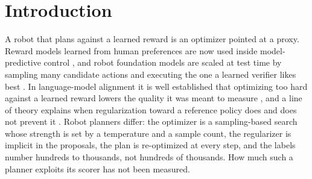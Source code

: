 \documentclass{article}
\theoremstyle{plain}
\theoremstyle{remark}
\begin{document}
\section{Introduction}
\label{sec:intro}

A robot that plans against a learned reward is an optimizer pointed at a proxy. Reward models learned from human
preferences are now used inside model-predictive control \citep{krupa2025learning,elhasnaouy2026active,nabail2026ubp2},
and robot foundation models are scaled at test time by sampling many candidate actions and executing the one a learned
verifier likes best \citep{kwok2025robomonkey}. In language-model alignment it is well established that optimizing
too hard against a learned reward lowers the quality it was meant to measure \citep{gao2023scaling,
coste2024ensembles,eisenstein2024helping}, and a line of theory explains when regularization toward a reference
policy does and does not prevent it \citep{huang2025chipo,huang2025bestofn,kwa2024catastrophic,laidlaw2025correlated}.
Robot planners differ: the optimizer is a sampling-based search whose strength is set by a temperature and a sample
count, the regularizer is implicit in the proposals, the plan is re-optimized at every step, and the labels number
hundreds to thousands, not hundreds of thousands. How much such a planner exploits its scorer has not been measured.
\end{document}
